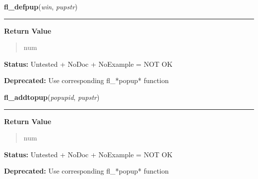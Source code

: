    \label{xformslib:library:fl_defpup}

    \vspace{0.5ex}

\hspace{.8\funcindent}\begin{boxedminipage}{\funcwidth}

    \raggedright \textbf{fl\_defpup}(\textit{win}, \textit{pupstr})

    \vspace{-1.5ex}

    \rule{\textwidth}{0.5\fboxrule}
\setlength{\parskip}{2ex}
\setlength{\parskip}{1ex}
      \textbf{Return Value}
    \vspace{-1ex}

      \begin{quote}
      num

      \end{quote}

\textbf{Status:} Untested + NoDoc + NoExample = NOT OK



\textbf{Deprecated:} Use corresponding fl\_*popup* function



    \end{boxedminipage}

    \label{xformslib:library:fl_addtopup}

    \vspace{0.5ex}

\hspace{.8\funcindent}\begin{boxedminipage}{\funcwidth}

    \raggedright \textbf{fl\_addtopup}(\textit{popupid}, \textit{pupstr})

    \vspace{-1.5ex}

    \rule{\textwidth}{0.5\fboxrule}
\setlength{\parskip}{2ex}
\setlength{\parskip}{1ex}
      \textbf{Return Value}
    \vspace{-1ex}

      \begin{quote}
      num

      \end{quote}

\textbf{Status:} Untested + NoDoc + NoExample = NOT OK



\textbf{Deprecated:} Use corresponding fl\_*popup* function



    \end{boxedminipage}

